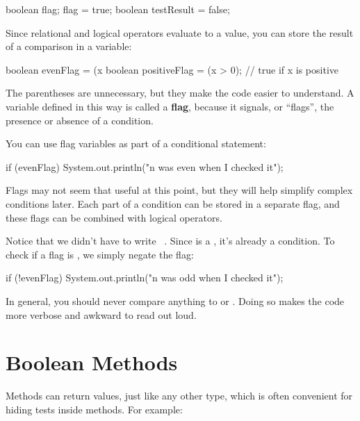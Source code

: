 \begin{code}
boolean flag;
flag = true;
boolean testResult = false;
\end{code}


Since relational and logical operators evaluate to a  value, you can store the result of a comparison in a variable:

\begin{code}
boolean evenFlag = (x %
boolean positiveFlag = (x > 0);     // true if x is positive
\end{code}


The parentheses are unnecessary, but they make the code easier to understand.
A variable defined in this way is called a {\bf flag}, because it signals, or ``flags'', the presence or absence of a condition.

You can use flag variables as part of a conditional statement:

\begin{code}
if (evenFlag) {
    System.out.println("n was even when I checked it");
}
\end{code}

Flags may not seem that useful at this point, but they will help simplify complex conditions later.
Each part of a condition can be stored in a separate flag, and these flags can be combined with logical operators.

Notice that we didn't have to write ~.
Since  is a , it's already a condition.
To check if a flag is , we simply negate the flag:

\begin{code}
if (!evenFlag) {
    System.out.println("n was odd when I checked it");
}
\end{code}

In general, you should never compare anything to  or .
Doing so makes the code more verbose and awkward to read out loud.


\section{Boolean Methods}
\label{boolmeth}


Methods can return  values, just like any other type, which is often convenient for hiding tests inside methods.
For example:

